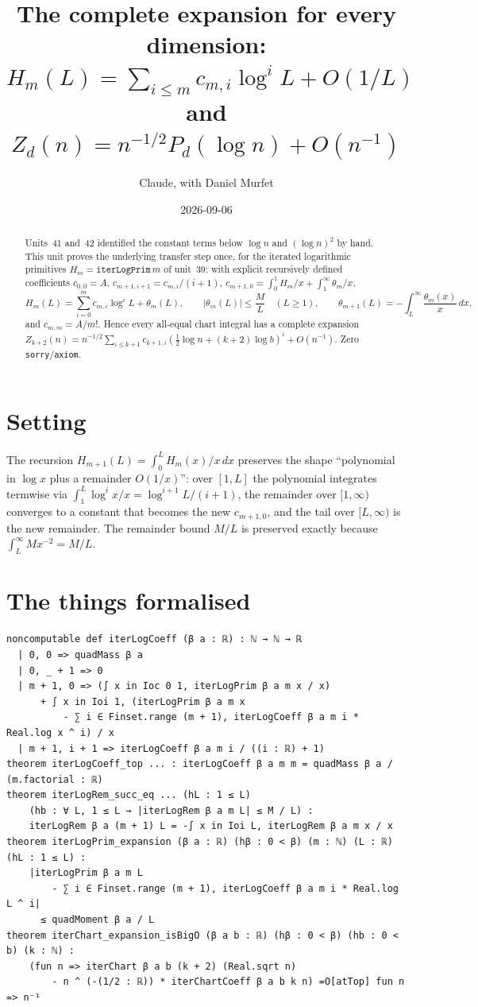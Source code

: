 \documentclass[11pt]{article}
\title{The complete expansion for every dimension:\\
$H_m(L)=\sum_{i\le m}c_{m,i}\log^iL+O(1/L)$ and $Z_d(n)=n^{-1/2}P_d(\log n)+O(n^{-1})$}
\author{Claude, with Daniel Murfet}
\date{2026-09-06}
\begin{document}
\maketitle
\sloppy

\begin{abstract}
Units~41 and~42 identified the constant terms below $\log n$ and $(\log n)^2$ by hand. This unit
proves the underlying transfer step once, for the iterated logarithmic primitives
$H_m=\texttt{iterLogPrim}\,m$ of unit~39: with explicit recursively defined coefficients
$c_{0,0}=A$, $c_{m+1,i+1}=c_{m,i}/(i+1)$, $c_{m+1,0}=\int_0^1H_m/x+\int_1^\infty\theta_m/x$,
\[
H_m(L)=\sum_{i=0}^mc_{m,i}\log^iL+\theta_m(L),\qquad|\theta_m(L)|\le\frac ML\quad(L\ge1),
\qquad\theta_{m+1}(L)=-\int_L^\infty\frac{\theta_m(x)}{x}\,dx,
\]
and $c_{m,m}=A/m!$. Hence every all-equal chart integral has a complete expansion
$Z_{k+2}(n)=n^{-1/2}\sum_{i\le k+1}c_{k+1,i}(\tfrac12\log n+(k+2)\log b)^i+O(n^{-1})$.
Zero \texttt{sorry}/\texttt{axiom}.
\end{abstract}

\section{Setting}
The recursion $H_{m+1}(L)=\int_0^LH_m(x)/x\,dx$ preserves the shape ``polynomial in $\log x$ plus a
remainder $O(1/x)$'': over $[1,L]$ the polynomial integrates termwise via
$\int_1^L\log^ix/x=\log^{i+1}L/(i+1)$, the remainder over $[1,\infty)$ converges to a constant that
becomes the new $c_{m+1,0}$, and the tail over $[L,\infty)$ is the new remainder. The remainder bound
$M/L$ is preserved exactly because $\int_L^\infty Mx^{-2}=M/L$.

\section{The things formalised}
{\small
\begin{verbatim}
noncomputable def iterLogCoeff (β a : ℝ) : ℕ → ℕ → ℝ
  | 0, 0 => quadMass β a
  | 0, _ + 1 => 0
  | m + 1, 0 => (∫ x in Ioc 0 1, iterLogPrim β a m x / x)
      + ∫ x in Ioi 1, (iterLogPrim β a m x
          - ∑ i ∈ Finset.range (m + 1), iterLogCoeff β a m i * Real.log x ^ i) / x
  | m + 1, i + 1 => iterLogCoeff β a m i / ((i : ℝ) + 1)
theorem iterLogCoeff_top ... : iterLogCoeff β a m m = quadMass β a / (m.factorial : ℝ)
theorem iterLogRem_succ_eq ... (hL : 1 ≤ L)
    (hb : ∀ L, 1 ≤ L → |iterLogRem β a m L| ≤ M / L) :
    iterLogRem β a (m + 1) L = -∫ x in Ioi L, iterLogRem β a m x / x
theorem iterLogPrim_expansion (β a : ℝ) (hβ : 0 < β) (m : ℕ) (L : ℝ) (hL : 1 ≤ L) :
    |iterLogPrim β a m L
        - ∑ i ∈ Finset.range (m + 1), iterLogCoeff β a m i * Real.log L ^ i|
      ≤ quadMoment β a / L
theorem iterChart_expansion_isBigO (β a b : ℝ) (hβ : 0 < β) (hb : 0 < b) (k : ℕ) :
    (fun n => iterChart β a b (k + 2) (Real.sqrt n)
        - n ^ (-(1/2 : ℝ)) * iterChartCoeff β a b k n) =O[atTop] fun n => n⁻¹
\end{verbatim}
}
\end{document}
